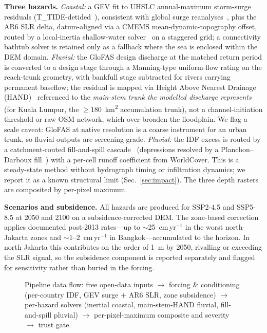 \documentclass[conference]{IEEEtran}
\begin{document}
\textbf{Three hazards.} \emph{Coastal:} a GEV fit to UHSLC annual-maximum storm-surge residuals (T\_TIDE-detided~\cite{ttide}), consistent with global surge reanalyses~\cite{muis2016,muis2020}, plus the AR6 SLR delta, datum-aligned via a CMEMS mean-dynamic-topography offset, routed by a local-inertia shallow-water solver~\cite{bates2010} on a staggered grid; a connectivity bathtub solver is retained only as a fallback where the sea is enclosed within the DEM domain. \emph{Fluvial:} the GloFAS design discharge at the matched return period is converted to a design stage through a Manning-type uniform-flow rating on the reach-trunk geometry, with bankfull stage subtracted for rivers carrying permanent baseflow; the residual is mapped via Height Above Nearest Drainage (HAND)~\cite{nobre2011,renno2008} referenced to the \emph{main-stem trunk the modelled discharge represents} (for Kuala Lumpur, the $\geq 180$~km\textsuperscript{2} accumulation trunk), not a channel-initiation threshold or raw OSM network, which over-broaden the floodplain. We flag a scale caveat: GloFAS at native resolution is a coarse instrument for an urban trunk, so fluvial outputs are screening-grade. \emph{Pluvial:} the IDF excess is routed by a catchment-routed fill-and-spill cascade~\cite{barnes2021} (depressions resolved by a Planchon--Darboux fill~\cite{planchon2002}) with a per-cell runoff coefficient from WorldCover. This is a steady-state method without hydrograph timing or infiltration dynamics; we report it as a known structural limit (Sec.~\ref{sec:impact}). The three depth rasters are composited by per-pixel maximum.

\textbf{Scenarios and subsidence.} All hazards are produced for SSP2-4.5 and SSP5-8.5 at 2050 and 2100 on a subsidence-corrected DEM. The zone-based correction applies documented post-2013 rates---up to $\sim$25~cm\,yr$^{-1}$ in the worst north-Jakarta zones and $\sim$1--2~cm\,yr$^{-1}$ in Bangkok---accumulated to the horizon. In north Jakarta this contributes on the order of 1~m by 2050, rivalling or exceeding the SLR signal, so the subsidence component is reported separately and flagged for sensitivity rather than buried in the forcing.

\begin{figure}[t]
\centering
\caption{Pipeline data flow: free open-data inputs $\rightarrow$ forcing \& conditioning (per-country IDF, GEV surge + AR6 SLR, zone subsidence) $\rightarrow$ per-hazard solvers (inertial coastal, main-stem-HAND fluvial, fill-and-spill pluvial) $\rightarrow$ per-pixel-maximum composite and severity $\rightarrow$ trust gate.}
\label{fig:pipeline}
\end{figure}
\end{document}
